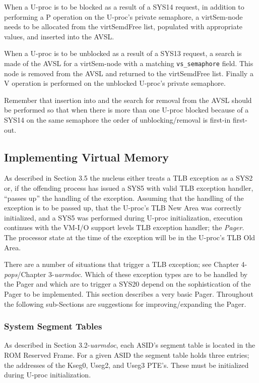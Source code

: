 When a U-proc is to be blocked as a result of a SYS14 request, in addition to performing a P operation on the U-proc's private semaphore, a virtSem-node needs to be allocated from the virtSemdFree list, populated with appropriate values, and inserted into the AVSL.

When a U-proc is to be unblocked as a result of a SYS13 request, a search is made of the AVSL for a virtSem-node with a matching \verb+vs_semaphore+ field.
This node is removed from the AVSL and returned to the virtSemdFree list.
Finally a V operation is performed on the unblocked U-proc's private semaphore.

Remember that insertion into and the search for removal from the AVSL should be performed so that when there is more than one U-proc blocked because of a SYS14 on the same semaphore the order of unblocking/removal is first-in first-out.



\subsection{Implementing Virtual Memory}
As described in Section 3.5 the nucleus either treats a TLB exception as a SYS2 or, if the offending process has issued a SYS5 with valid TLB exception handler, ``passes up'' the handling of the exception. 
Assuming that the handling of the exception is to be passed up, that the U-proc's TLB New Area was correctly initialized, and a SYS5 was performed during U-proc initialization, execution continues with the VM-I/O support levels TLB exception handler; the \emph{Pager}. 
The processor state at the time of the exception will be in the U-proc's TLB Old Area.

There are a number of situations that trigger a TLB exception; see Chapter 4-\emph{pops}/Chapter 3-\emph{uarmdoc}. 
Which of these exception types are to be handled by the Pager and which are to trigger a SYS20 depend on the sophistication of the Pager to be implemented.
This section describes a very basic Pager. 
Throughout the following sub-Sections are suggestions for improving/expanding the Pager.


\subsubsection{System Segment Tables}
As described in Section 3.2-\emph{uarmdoc}, each ASID's segment table is located in the ROM Reserved Frame. 
For a given ASID the segment table holds three entries; the addresses of the Kseg0, Useg2, and Useg3 PTE's. 
These must be initialized during U-proc initialization.

